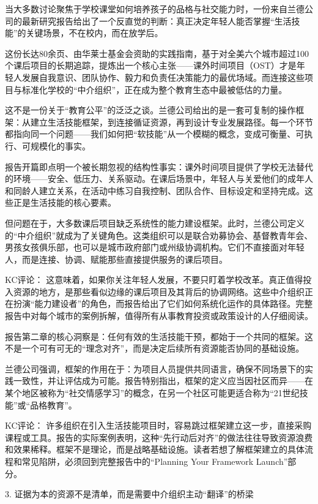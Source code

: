 \documentclass[11pt]{ctexart}
\begin{document}
当大多数讨论聚焦于学校课堂如何培养孩子的品格与社交能力时，一份来自兰德公司的最新研究报告给出了一个反直觉的判断：真正决定年轻人能否掌握“生活技能”的关键场景，不在校内，而在放学后。

这份长达80余页、由华莱士基金会资助的实践指南，基于对全美六个城市超过100个课后项目的长期追踪，提炼出一个核心主张——课外时间项目（OST）才是年轻人发展自我意识、团队协作、毅力和负责任决策能力的最优场域。而连接这些项目与标准化学校的“中介组织”，正在成为整个教育生态中最被低估的力量。

这不是一份关于“教育公平”的泛泛之谈。兰德公司给出的是一套可复制的操作框架：从建立生活技能框架，到连接循证资源，再到设计专业发展路径。每一个环节都指向同一个问题——我们如何把“软技能”从一个模糊的概念，变成可衡量、可执行、可规模化的事实。

报告开篇即点明一个被长期忽视的结构性事实：课外时间项目提供了学校无法替代的环境——安全、低压力、关系驱动。在课后场景中，年轻人与关爱他们的成年人和同龄人建立关系，在活动中练习自我控制、团队合作、目标设定和坚持完成。这些正是生活技能的核心要素。

但问题在于，大多数课后项目缺乏系统性的能力建设框架。此时，兰德公司定义的“中介组织”就成为了关键角色。这类组织可以是联合劝募协会、基督教青年会、男孩女孩俱乐部，也可以是城市政府部门或州级协调机构。它们不直接面对年轻人，而是连接、协调、赋能那些直接提供服务的课后项目。

KC评论： 这意味着，如果你关注年轻人发展，不要只盯着学校改革。真正值得投入资源的地方，是那些看似边缘的课后项目及其背后的协调网络。这些中介组织正在扮演“能力建设者”的角色，而报告给出了它们如何系统化运作的具体路径。完整报告中对每个城市的案例拆解，值得所有从事教育投资或政策设计的人仔细阅读。

报告第二章的核心洞察是：任何有效的生活技能干预，都始于一个共同的框架。这不是一个可有可无的“理念对齐”，而是决定后续所有资源能否协同的基础设施。

兰德公司强调，框架的作用在于：为项目人员提供共同语言，确保不同场景下的实践一致性，并让评估成为可能。报告特别指出，框架的定义应当因社区而异——在某个地区被称为“社交情感学习”的概念，在另一个社区可能更适合称为“21世纪技能”或“品格教育”。

KC评论： 许多组织在引入生活技能项目时，容易跳过框架建立这一步，直接采购课程或工具。报告的实际案例表明，这种“先行动后对齐”的做法往往导致资源浪费和效果稀释。框架不是理论，而是战略基础设施。读者若想了解框架建立的具体流程和常见陷阱，必须回到完整报告中的“Planning Your Framework Launch”部分。

3. 证据为本的资源不是清单，而是需要中介组织主动“翻译”的桥梁
\end{document}
